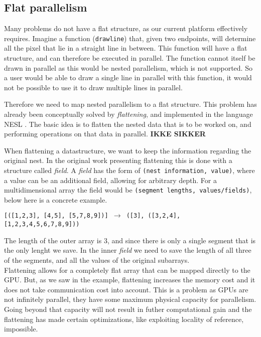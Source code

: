 \subsection{Flat parallelism}
Many problems do not have a flat structure, as our current platform
effectively requires. Imagine a function (\texttt{drawline}) that, given two
endpoints, will determine all the pixel that lie in a straight line in between.
This function will have a flat structure, and can therefore be executed
in parallel. The function cannot itself be drawn in parallel as this would be
nested parallelism, which is not supported. So a user would be able to draw a
single line in parallel with this function, it would not be possible to use it
to draw multiple lines in parallel.

Therefore we need to map nested parallelism to a flat structure. This problem
has already been conceptually solved by \textit{flattening}, and implemented in
the language NESL \cite{nesl}. The basic idea is to flatten the nested data
that is to be worked on, and performing operations on that data in parallel.  
\textbf{IKKE SIKKER}

When flattening a datastructure, we want to keep the information regarding the
original nest. In the original work presenting flattening \cite{flat} this is 
done
with a structure called \textit{field}. A \textit{field} has the form of 
\texttt{(nest
information, value)}, where a value can be an additional field, allowing for
arbitrary depth. For a multidimensional array the field would be
\texttt{(segment lengths, values/fields)}, below here is a concrete example.  
\begin{center}
  \texttt{[([1,2,3], [4,5], [5,7,8,9])] $\to$ ([3], ([3,2,4],
[1,2,3,4,5,6,7,8,9]))}
\end{center}
The length of the outer array is 3, and since there is only a single segment
that is the only lenght we save. In the inner \textit{field} we need to save
the length of all three of the segments, and all the values of the original
subarrays.\\

Flattening allows for a completely flat array that can be mapped directly to 
the
GPU. But, as we saw in the example, flattening increases the memory cost and
it does not take communication cost into account. This is a problem as GPUs are 
not
infinitely parallel, they have some maximum physical capacity for parallelism.
Going beyond that capacity will not result in futher computational gain and the
flattening has made certain optimizations, like exploiting locality of 
reference,
impossible.

